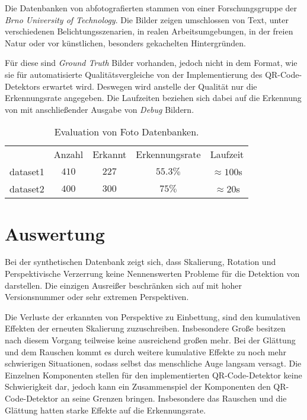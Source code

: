 \noindent Die Datenbanken von abfotografierten \QRCodes stammen von einer Forschungsgruppe der \emph{Brno University of Technology}. Die Bilder zeigen \QRCodes umschlossen von Text, unter verschiedenen Belichtungsszenarien, in realen Arbeitsumgebungen, in der freien Natur oder vor künstlichen, besonders gekachelten Hintergründen.

Für diese \QRCodes sind \emph{Ground Truth} Bilder vorhanden, jedoch nicht in dem Format, wie sie für automatisierte Qualitätsvergleiche von der Implementierung des QR-Code-Detektors erwartet wird. Deswegen wird anstelle der Qualität nur die Erkennungsrate angegeben. Die Laufzeiten beziehen sich dabei auf die Erkennung von \QRCodes mit anschließender Ausgabe von \emph{Debug} Bildern.

\begin{table}[h]
\centering
\begin{tabular}{l c c c c}
 		& Anzahl & Erkannt & Erkennungsrate & Laufzeit \\
		dataset1 & $410$ & $227$ & $55.3\%$ & $\approx100$s \\
		dataset2 & $400$ & $300$ & $75\%$ & $\approx20$s \\
\end{tabular}
\caption{Evaluation von Foto Datenbanken.}
\end{table}

\newpage
\section{Auswertung}
Bei der synthetischen Datenbank zeigt sich, dass Skalierung, Rotation und Perspektivische Verzerrung keine Nennenswerten Probleme für die Detektion von \QRCodes darstellen. Die einzigen Ausreißer beschränken sich auf \QRCodes mit hoher Versionsnummer oder sehr extremen Perspektiven.

Die Verluste der erkannten \QRCodes von Perspektive zu Einbettung, sind den kumulativen Effekten der erneuten Skalierung zuzuschreiben. Insbesondere Große \QRCodes besitzen nach diesem Vorgang teilweise keine ausreichend großen \fps mehr.
Bei der Glättung und dem Rauschen kommt es durch weitere kumulative Effekte zu noch mehr schwierigen Situationen, sodass selbst das menschliche Auge langsam versagt.
Die Einzelnen Komponenten stellen für den implementierten QR-Code-Detektor keine Schwierigkeit dar, jedoch kann ein Zusammenspiel der Komponenten den QR-Code-Detektor an seine Grenzen bringen. Insbesondere das Rauschen und die Glättung hatten starke Effekte auf die Erkennungsrate.

